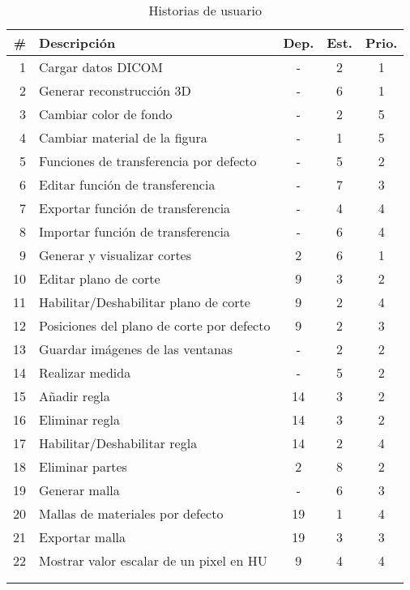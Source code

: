 \begin{longtable} {r l c c c}
	\hline
	\#	&	Descripción									&	Dep.	&	Est.	&	Prio.	\\
	\hline \hline
	\endhead
	1	&	Cargar datos DICOM							&	-		&	2		&	1	\\
	\hline
	2	&	Generar reconstrucción 3D					&	-		&	6		&	1	\\
	\hline
	3	&	Cambiar color de fondo						&	-		&	2		&	5	\\
	\hline
	4	&	Cambiar material de la figura				&	-		&	1		&	5	\\
	\hline
	5	&	Funciones de transferencia por defecto		&	-		&	5		&	2	\\
	\hline
	6	&	Editar función de transferencia				&	-		&	7		&	3	\\
	\hline
	7	&	Exportar función de transferencia			&	-		&	4		&	4	\\
	\hline
	8	&	Importar función de transferencia			&	-		&	6		&	4	\\
	\hline
	9	&	Generar y visualizar cortes					&	2		&	6		&	1	\\
	\hline
	10	&	Editar plano de corte						&	9		&	3		&	2	\\
	\hline
	11	&	Habilitar/Deshabilitar plano de corte		&	9		&	2		&	4	\\
	\hline
	12	&	Posiciones del plano de corte por defecto	&	9		&	2		&	3	\\
	\hline
	13	&	Guardar imágenes de las ventanas			&	-		&	2		&	2	\\
	\hline
	14	&	Realizar medida								&	-		&	5		&	2	\\
	\hline
	15	&	Añadir regla								&	14		&	3		&	2	\\
	\hline
	16	&	Eliminar regla								&	14		&	3		&	2	\\
	\hline
	17	&	Habilitar/Deshabilitar regla				&	14		&	2		&	4	\\
	\hline
	18	&	Eliminar partes								&	2		&	8		&	2	\\
	\hline
	19	&	Generar malla								&	-		&	6		&	3	\\
	\hline
	20	&	Mallas de materiales por defecto			&	19		&	1		&	4	\\
	\hline
	21	&	Exportar malla								&	19		&	3		&	3	\\
	\hline
	22	&	Mostrar valor escalar de un pixel en HU		&	9		&	4		&	4	\\
	\hline
	\\
	\caption{Historias de usuario}
	\label{tab:hus}
\end{longtable}

